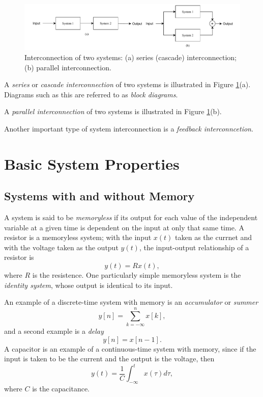 \documentclass[a4paper,twoside]{book}
\begin{document}
\begin{figure}[htbp]
    \centering
    \includegraphics[width=\linewidth]{Fig3.pdf}
    \caption{Interconnection of two systems: (a) series (cascade) interconnection; (b) parallel interconnection.}
    \label{Fig3}
\end{figure}

A \textit{series} or \textit{cascade interconnection} of two systems is illustrated in Figure \ref{Fig3}(a). Diagrams such as this are referred to as \textit{block diagrams}.

A \textit{parallel interconnection} of two systems is illustrated in Figure \ref{Fig3}(b).

Another important type of system interconnection is a \textit{feedback interconncetion}.

\section{Basic System Properties}
\subsection{Systems with and without Memory}
\label{section:1.6.1}

A system is said to be \textit{memoryless} if its output for each value of the independent variable at a given time is dependent on the input at only that same time. A resistor is a memoryless system; with the input $x(t)$ taken as the currnet and with the voltage taken as the output $y(t)$, the input-output relationship of a resistor is
\begin{equation}
    y(t)=Rx(t),
    \label{1.91}
\end{equation}
where $R$ is the resistence. One particularly simple memoryless system is the \textit{identity system}, whose output is identical to its input.

An example of a discrete-time system with memory is an \textit{accumulator} or \textit{summer}
\begin{equation}
    y[n]=\sum\limits_{k=-\infty}^nx[k],
    \label{1.92}
\end{equation}
and a second example is a \textit{delay}
\begin{equation}
    y[n]=x[n-1].
    \label{1.93}
\end{equation}
A capacitor is an example of a continuous-time system with memory, since if the input is taken to be the current and the output is the voltage, then
\begin{equation}
    y(t)=\dfrac1C\int_{-\infty}^tx(\tau)d\tau,
    \label{1.94}
\end{equation}
where $C$ is the capacitance.
\end{document}
